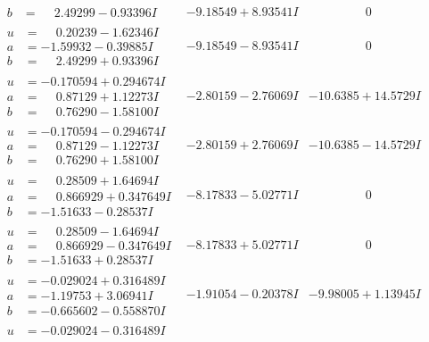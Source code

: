 \documentclass[1p]{elsarticle_modified}
\theoremstyle{definition}
\begin{document}
$$\begin{array}{c|c|c}
\begin{aligned}
b &= \phantom{-}2.49299 - 0.93396 I\end{aligned}
 & -9.18549 + 8.93541 I & \phantom{-0.000000 } 0 \\ \hline\begin{aligned}
u &= \phantom{-}0.20239 - 1.62346 I \\
a &= -1.59932 - 0.39885 I \\
b &= \phantom{-}2.49299 + 0.93396 I\end{aligned}
 & -9.18549 - 8.93541 I & \phantom{-0.000000 } 0 \\ \hline\begin{aligned}
u &= -0.170594 + 0.294674 I \\
a &= \phantom{-}0.87129 + 1.12273 I \\
b &= \phantom{-}0.76290 - 1.58100 I\end{aligned}
 & -2.80159 - 2.76069 I & -10.6385 + 14.5729 I \\ \hline\begin{aligned}
u &= -0.170594 - 0.294674 I \\
a &= \phantom{-}0.87129 - 1.12273 I \\
b &= \phantom{-}0.76290 + 1.58100 I\end{aligned}
 & -2.80159 + 2.76069 I & -10.6385 - 14.5729 I \\ \hline\begin{aligned}
u &= \phantom{-}0.28509 + 1.64694 I \\
a &= \phantom{-}0.866929 + 0.347649 I \\
b &= -1.51633 - 0.28537 I\end{aligned}
 & -8.17833 - 5.02771 I & \phantom{-0.000000 } 0 \\ \hline\begin{aligned}
u &= \phantom{-}0.28509 - 1.64694 I \\
a &= \phantom{-}0.866929 - 0.347649 I \\
b &= -1.51633 + 0.28537 I\end{aligned}
 & -8.17833 + 5.02771 I & \phantom{-0.000000 } 0 \\ \hline\begin{aligned}
u &= -0.029024 + 0.316489 I \\
a &= -1.19753 + 3.06941 I \\
b &= -0.665602 - 0.558870 I\end{aligned}
 & -1.91054 - 0.20378 I & -9.98005 + 1.13945 I \\ \hline\begin{aligned}
u &= -0.029024 - 0.316489 I \\

\end{aligned}
\end{array}$$
\end{document}
